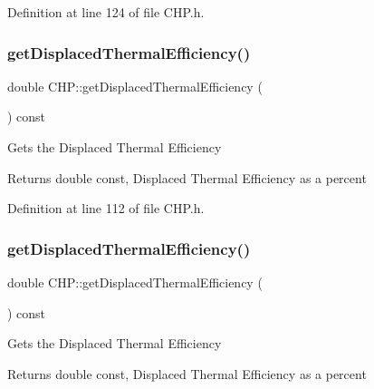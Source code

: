 Definition at line 124 of file C\+H\+P.\+h.

\mbox{\label{class_c_h_p_a66b1b0e6a0d7f3181b3c1dfb590ab523}} 
\subsubsection{\texorpdfstring{get\+Displaced\+Thermal\+Efficiency()}{getDisplacedThermalEfficiency()}\hspace{0.1cm}{\footnotesize\ttfamily [1/3]}}
{\footnotesize\ttfamily double C\+H\+P\+::get\+Displaced\+Thermal\+Efficiency (\begin{DoxyParamCaption}{ }\end{DoxyParamCaption}) const\hspace{0.3cm}{\ttfamily [inline]}}

Gets the Displaced Thermal Efficiency

\begin{DoxyReturn}{Returns}
double const, Displaced Thermal Efficiency as a percent 
\end{DoxyReturn}


Definition at line 112 of file C\+H\+P.\+h.

\mbox{\label{class_c_h_p_a66b1b0e6a0d7f3181b3c1dfb590ab523}} 
\subsubsection{\texorpdfstring{get\+Displaced\+Thermal\+Efficiency()}{getDisplacedThermalEfficiency()}\hspace{0.1cm}{\footnotesize\ttfamily [2/3]}}
{\footnotesize\ttfamily double C\+H\+P\+::get\+Displaced\+Thermal\+Efficiency (\begin{DoxyParamCaption}{ }\end{DoxyParamCaption}) const\hspace{0.3cm}{\ttfamily [inline]}}

Gets the Displaced Thermal Efficiency

\begin{DoxyReturn}{Returns}
double const, Displaced Thermal Efficiency as a percent 
\end{DoxyReturn}


